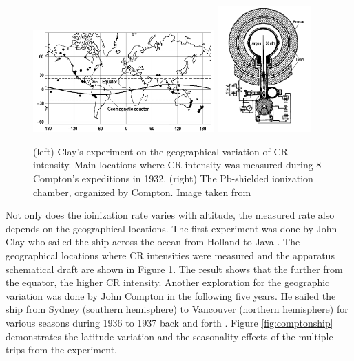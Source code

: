 
\begin{figure}[h!]
    \centering
        \subfloat
        {
            \includegraphics[width=0.62\textwidth]{content/background/figures/clay_geographical.png}
        }
        \hfill
        \subfloat
        {
            \includegraphics[width=0.32\textwidth]{content/background/figures/compton_pb_shield.png}
        }
        \caption{
            (left) Clay's experiment on the geographical variation
            of CR intensity. Main locations where CR intensity was
            measured during 8 Compton's expeditions in 1932.
            (right) The Pb-shielded ionization chamber, 
            organized by Compton. Image taken from
            \cite{text_cr_geomagnetic_effect} 
        }
       \label{fig:clay_cr_ship}
\end{figure}

Not only does the ioinization rate varies with altitude,
the measured rate also depends on the geographical locations.
The first experiment was done by John Clay who
sailed the ship across the ocean from Holland to Java
\citep{Clay1927,Clay1928}. The geographical locations
where CR intensities were measured
and the apparatus schematical draft are shown in Figure
\ref{fig:clay_cr_ship}. The result shows that
the further from the equator, the higher CR intensity.
Another exploration for the geographic variation was 
done by John Compton in the following five years.
He sailed the ship from Sydney (southern hemisphere)
to Vancouver (northern hemisphere) for various seasons
during 1936 to 1937 back and forth \citep{compton1937cosmic}.
Figure \ref{fig:comptonship} demonstrates the 
latitude variation and the seasonality effects of the 
multiple trips from the experiment.

